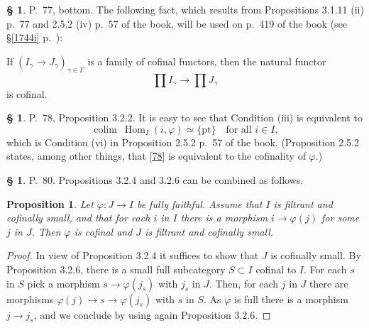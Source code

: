 \documentclass[12pt]{article}
\newtheorem{prop}[thm]{Proposition}
\theoremstyle{remark}
\theoremstyle{definition}
\newtheorem{s}[thm]{\S}
\newcommand{\pt}{\{\text{pt}\}}
\newcommand{\pp}{\varphi}
\DeclareMathOperator*{\colim}{colim}
\DeclareMathOperator{\Hom}{Hom}
\begin{document}
%

\begin{s}\label{poc}
P.~77, bottom. The following fact, which results from Propositions 3.1.11 (ii) p.~77 and 2.5.2 (iv) p.~57 of the book, will be used on p.~419 of the book (see \S\ref{1744i} p.~\pageref{1744i}):

If $(I_\gamma\to J_\gamma)_{\gamma\in\Gamma}$ is a family of cofinal functors, then the natural functor 
$$
\prod I_\gamma\to\prod J_\gamma
$$ 
is cofinal. 
\end{s}

%

\begin{s} 
P.~78, Proposition 3.2.2. It is easy to see that Condition (iii) is equivalent to
%
\begin{equation}\label{78} 
\colim\ \Hom_I(i,\pp)\simeq\pt\quad\text{for all }i\in I, 
\end{equation} 
%
which is Condition (vi) in Proposition 2.5.2 p.~57 of the book. (Proposition 2.5.2 states, among other things, that \eqref{78} is equivalent to the cofinality of $\pp$.)
\end{s}

%

\begin{s} 
P.~80. Propositions 3.2.4 and 3.2.6 can be combined as follows. 

\begin{prop}\label{comb}
Let $\pp:J\to I$ be fully faithful. Assume that $I$ is filtrant and cofinally small, and that for each $i$ in $I$ there is a morphism $i\to\pp(j)$ for some $j$ in $J$. Then $\pp$ is cofinal and $J$ is filtrant and cofinally small. 
\end{prop} 

\begin{proof}
In view of Proposition 3.2.4 it suffices to show that $J$ is cofinally small. By Proposition 3.2.6, there is a small full subcategory $S\subset I$ cofinal to $I$. For each $s$ in $S$ pick a morphism $s\to\pp(j_s)$ with $j_s$ in $J$. Then, for each $j$ in $J$ there are morphisms $\pp(j)\to s\to\pp(j_s)$ with $s$ in $S$. As $\pp$ is full there is a morphism $j\to j_s$, and we conclude by using again Proposition 3.2.6.
\end{proof}
\end{s}

%
\end{document}
